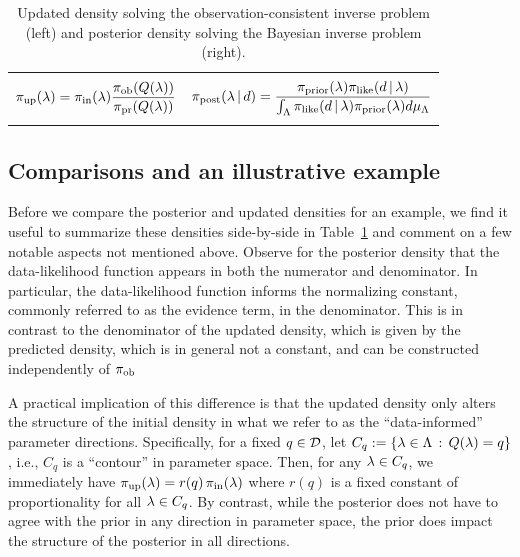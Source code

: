 \begin{table}[htbp]
\centering
\begin{tabular}{|c|c|}
\hline
 & \\
$\displaystyle \operatorname*{\pi_{up}}(\lambda) = \operatorname*{\pi_{in}}(\lambda) \frac{\operatorname*{\pi_{ob}}(Q(\lambda))}{\operatorname*{\pi_{pr}}(Q(\lambda))}
$
&
$
	\displaystyle \pi_{\text{post}}(\lambda\,|\,d) = \frac{\pi_{\text{prior}}(\lambda)\pi_\text{like}(d\,|\,\lambda)}{\int_{\Lambda} \pi_\text{like}(d\, |\, \lambda)  \pi_{\text{prior}}(\lambda) d\mu_{{\Lambda}}}
$
 \\ & \\ \hline
\end{tabular}
\caption{Updated density solving the observation-consistent inverse problem (left) and posterior density solving the Bayesian inverse problem (right).}
		\label{tab:dens_comparisons}
\end{table}

\subsection{Comparisons and an illustrative example}

Before we compare the posterior and updated densities for an example, we find it useful to summarize these densities side-by-side in Table~\ref{tab:dens_comparisons} and comment on a few notable aspects not mentioned above.
Observe for the posterior density that the data-likelihood function appears in both the numerator and denominator.
In particular, the data-likelihood function informs the {normalizing constant}, commonly referred to as the evidence term, in the denominator.
This is in contrast to the denominator of the updated density, which is given by the predicted density, which is in general not a constant, and can be constructed independently of $\operatorname*{\pi_{ob}}$

A practical implication of this difference is that the updated density only alters the structure of the initial density in what we refer to as the ``data-informed'' parameter directions.
Specifically, for a fixed $q\in\mathcal{D}$, let $C_q := \left\{\lambda\in{\Lambda}\, : \, Q(\lambda)=q\right\}$, i.e., $C_q$ is a ``contour'' in parameter space.
Then, for any $\lambda\in C_q$, we immediately have $\operatorname*{\pi_{up}}(\lambda)=r(q)\operatorname*{\pi_{in}}(\lambda)$ where $r(q)$ is a fixed constant of proportionality for all $\lambda\in C_q$.
By contrast, while the posterior does not have to agree with the prior in any direction in parameter space, the prior does impact the structure of the posterior in all directions.


